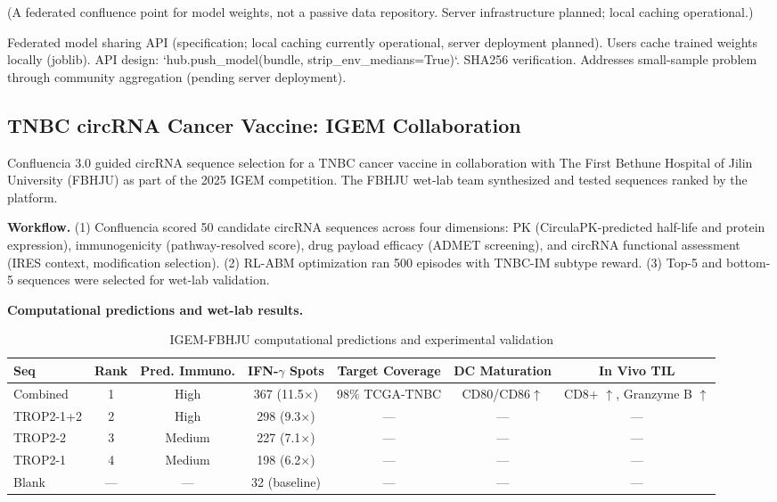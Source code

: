 \documentclass[11pt,a4paper]{article}
\begin{document}
(A federated confluence point for model weights, not a passive data repository. Server infrastructure planned; local caching operational.)

Federated model sharing API (specification; local caching currently operational, server deployment planned). Users cache trained weights locally (joblib). API design: `hub.push\_model(bundle, strip\_env\_medians=True)`. SHA256 verification. Addresses small-sample problem through community aggregation (pending server deployment).

\subsection{TNBC circRNA Cancer Vaccine: IGEM Collaboration}

Confluencia 3.0 guided circRNA sequence selection for a TNBC cancer vaccine in collaboration with The First Bethune Hospital of Jilin University (FBHJU) as part of the 2025 IGEM competition. The FBHJU wet-lab team synthesized and tested sequences ranked by the platform.

\textbf{Workflow.} (1) Confluencia scored 50 candidate circRNA sequences across four dimensions: PK (CirculaPK-predicted half-life and protein expression), immunogenicity (pathway-resolved score), drug payload efficacy (ADMET screening), and circRNA functional assessment (IRES context, modification selection). (2) RL-ABM optimization ran 500 episodes with TNBC-IM subtype reward. (3) Top-5 and bottom-5 sequences were selected for wet-lab validation.

\textbf{Computational predictions and wet-lab results.}

\begin{table}[H]
\centering
\caption{IGEM-FBHJU computational predictions and experimental validation}
\label{tab:igem_validation}
\begin{tabular}{lcccccc}
\toprule
\textbf{Seq} & \textbf{Rank} & \textbf{Pred. Immuno.} & \textbf{IFN-$\gamma$ Spots} & \textbf{Target Coverage} & \textbf{DC Maturation} & \textbf{In Vivo TIL} \\
\midrule
Combined & 1 & High & 367 (11.5$\times$) & 98\% TCGA-TNBC & CD80/CD86$\uparrow$ & CD8+ $\uparrow$, Granzyme B $\uparrow$ \\
TROP2-1+2 & 2 & High & 298 (9.3$\times$) & --- & --- & --- \\
TROP2-2 & 3 & Medium & 227 (7.1$\times$) & --- & --- & --- \\
TROP2-1 & 4 & Medium & 198 (6.2$\times$) & --- & --- & --- \\
Blank & --- & --- & 32 (baseline) & --- & --- & --- \\
\bottomrule
\end{tabular}
\end{table}
\end{document}
